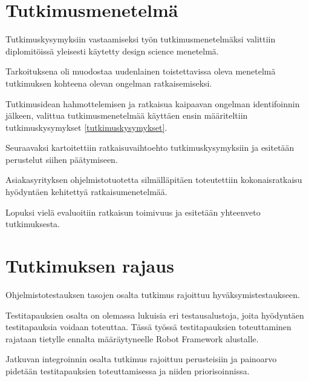 \section{Tutkimusmenetelmä}

Tutkimuskysymyksiin vastaamiseksi työn tutkimusmenetelmäksi valittiin diplomitöissä yleisesti käytetty design science menetelmä.

Tarkoituksena oli muodostaa uudenlainen toistettavissa oleva menetelmä tutkimuksen kohteena olevan ongelman ratkaisemiseksi.

Tutkimusidean hahmottelemisen ja ratkaisua kaipaavan ongelman identifoinnin jälkeen, valittua tutkimusmenetelmää käyttäen ensin määriteltiin tutkimuskysymykset \ref{tutkimuskysymykset}.

Seuraavaksi kartoitettiin ratkaisuvaihtoehto tutkimuskysymyksiin ja esitetään perustelut siihen päätymiseen.

Asiakasyrityksen ohjelmistotuotetta silmälläpitäen toteutettiin kokonaisratkaisu hyödyntäen kehitettyä ratkaisumenetelmää.

Lopuksi vielä evaluoitiin ratkaisun toimivuus ja esitetään yhteenveto tutkimuksesta.


\section{Tutkimuksen rajaus}

Ohjelmistotestauksen tasojen osalta tutkimus rajoittuu hyväksymistestaukseen.

Testitapauksien osalta on olemassa lukuisia eri testausalustoja, joita hyödyntäen testitapauksia voidaan toteuttaa. Tässä työssä testitapauksien toteuttaminen rajataan tietylle ennalta määräytyneelle Robot Framework alustalle.

Jatkuvan integroinnin osalta tutkimus rajoittuu perusteisiin ja painoarvo pidetään testitapauksien toteuttamisessa ja niiden priorisoinnissa.

